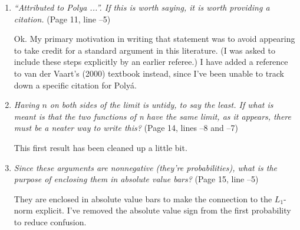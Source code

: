 \documentclass[12pt]{article}
\begin{document}
\begin{enumerate}
\item \emph{``Attributed to Polya ...''. If this is worth saying, it
    is worth providing a citation.} (Page 11, line --5)

  Ok. My primary motivation in writing that statement was to avoid
  appearing to take credit for a standard argument in this
  literature. (I was asked to include these steps explicitly by an
  earlier referee.)  I have added a reference to van der Vaart's
  (2000) textbook instead, since I've been unable to track down a
  specific citation for Poly\'a.


\item \emph{Having $n$ on both sides of the limit is untidy, to say
    the least. If what is meant is that the two functions of n have
    the same limit, as it appears, there must be a neater way to write
    this?} (Page 14, lines --8 and --7)

  This first result has been cleaned up a little bit.

\item \emph{Since these arguments are nonnegative (they're
    probabilities), what is the purpose of enclosing them in absolute
    value bars?} (Page 15, line --5)

  They are enclosed in absolute value bars to make the connection to the
  $L_{1}$-norm explicit. I've removed the absolute value sign from the first
  probability to reduce confusion.

\end{enumerate}
\end{document}
